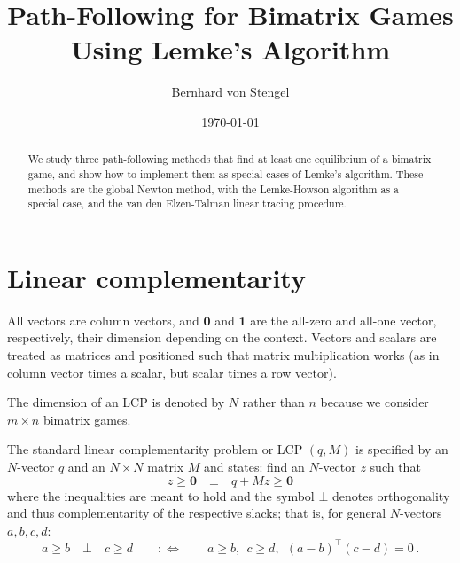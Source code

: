 \documentclass[a4paper,12pt]{article}  %
\title{%
Path-Following for Bimatrix Games Using Lemke's Algorithm
}
\author{Bernhard von Stengel}
\date{\today
\\[1ex]
}
\theoremstyle{definition}
\newcommand{\T}{^{\top}}
\newcommand{\0}{{\mathbf0}}
\newcommand{\1}{{\mathbf1}}
\begin{document}
\maketitle

\begin{abstract}
We study three path-following methods that find at least one
equilibrium of a bimatrix game, and show how to implement
them as special cases of Lemke's algorithm.
These methods are the global Newton method, with the
Lemke-Howson algorithm as a special case, and the
van den Elzen-Talman linear tracing procedure.

% 
% 
% 
% 
% 
% 
% 
% 
\end{abstract}

\section{Linear complementarity} 
\label{s-lcp}

All vectors are column vectors, and $\0$ and $\1$ are the
all-zero and all-one vector, respectively, their dimension
depending on the context.
Vectors and scalars are treated as matrices and positioned
such that matrix multiplication works (as in column vector
times a scalar, but scalar times a row vector).

The dimension of an LCP is denoted by $N$ rather than $n$
because we consider $m\times n$ bimatrix games.

The standard linear complementarity problem or LCP $(q,M)$
is specified by an $N$-vector $q$ and an $N\times N$ matrix
$M$ and states: find an $N$-vector $z$ such that
\begin{equation}
\label{lcp}
z\ge\0
\quad\bot\quad
q+Mz\ge\0
\end{equation}
where the inequalities are meant to hold and
the symbol $\bot$ denotes orthogonality and thus
complementarity of the respective slacks; that is, for
general $N$-vectors $a,b,c,d$:
\begin{equation}
\label{bot}
a\ge b
\quad\bot\quad 
c\ge d
\qquad:\Leftrightarrow\qquad
a\ge b,~~
c\ge d,~~
(a-b)\T (c-d)=0\,.
\end{equation}
\end{document}
